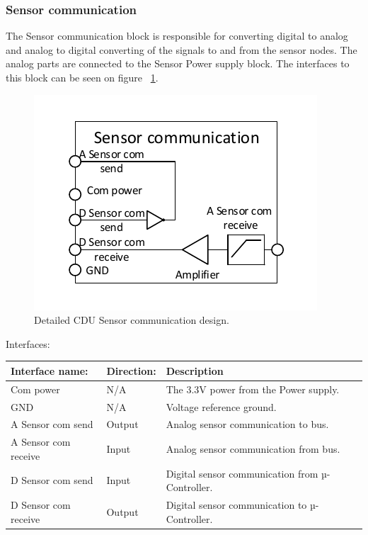 \subsubsection{Sensor communication}
The Sensor communication block is responsible for converting digital to analog and analog to digital converting of the signals to and from the sensor nodes. The analog parts are connected to the Sensor Power supply block.
The interfaces to this block can be seen on figure ~\ref{fig:CDUSC}.\\
\begin{figure}[H]
	\centering
	\includegraphics[scale=1]{billeder/CDUSC}
	\caption{Detailed CDU Sensor communication design.}
	\label{fig:CDUSC}
\end{figure}
Interfaces:
\begin{table}[H]
	\centering
	\begin{tabular}{|p{3cm} |p{3cm}| p{8cm}| }
		\hline
		Interface name: & Direction: 	& Description \\ \hline
		Com power	  &N/A & The 3.3V power from the Power supply. \\ \hline
		GND				&N/A & Voltage reference ground. \\\hline 
		A Sensor com send	&Output & Analog sensor communication to bus. \\\hline 
		A Sensor com receive &Input	& Analog sensor communication from bus. \\\hline
		D Sensor com send & Input	& Digital sensor communication from µ-Controller. \\\hline 
		D Sensor com receive &Output	& Digital sensor communication to µ-Controller. \\\hline
	\end{tabular}
\end{table}



